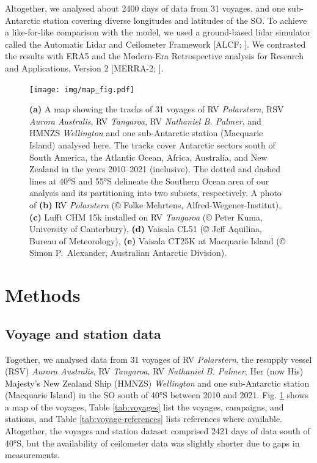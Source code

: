 \documentclass[12pt,a4paper]{article}
\begin{document}
Altogether, we analysed about 2400 days of data from 31 voyages, and one
sub-Antarctic station covering diverse longitudes and latitudes of the SO. To
achieve a like-for-like comparison with the model, we used a ground-based lidar
simulator called the Automatic Lidar and Ceilometer Framework [ALCF;
\cite{kuma2021}]. We contrasted the results with ERA5 \citep{era5} and the
Modern-Era Retrospective analysis for Research and Applications, Version 2
[MERRA-2; \cite{gelaro2017}].

\begin{figure}[b!]
\centering
\texttt{[image: img/map\_fig.pdf]}
\caption{
\textbf{(a)} A map showing the tracks of 31 voyages of RV \emph{Polarstern},
RSV \emph{Aurora Australis}, RV \emph{Tangaroa}, RV \emph{Nathaniel B. Palmer},
and HMNZS \emph{Wellington} and one sub-Antarctic station (Macquarie Island)
analysed here. The tracks cover Antarctic sectors south of South America, the
Atlantic Ocean, Africa, Australia, and New Zealand in the years 2010--2021
(inclusive).  The dotted and dashed lines at 40°S and 55°S delineate the
Southern Ocean area of our analysis and its partitioning into two subsets,
respectively.  A photo of \textbf{(b)} RV \emph{Polarstern} (© Folke Mehrtens,
Alfred-Wegener-Institut), \textbf{(c)} Lufft CHM 15k installed on RV
\emph{Tangaroa} (© Peter Kuma, University of Canterbury), \textbf{(d)} Vaisala
CL51 (© Jeff Aquilina, Bureau of Meteorology), \textbf{(e)} Vaisala CT25K at
Macquarie Island (© Simon P.\ Alexander, Australian Antarctic Division).
}
\label{fig:map}
\end{figure}

\section{Methods}
\label{sec:methods}

\subsection{Voyage and station data}

Together, we analysed data from 31 voyages of RV \emph{Polarstern}, the resupply
vessel (RSV) \emph{Aurora Australis}, RV \emph{Tangaroa}, RV \emph{Nathaniel B.
Palmer}, Her (now His) Majesty's New Zealand Ship (HMNZS) \emph{Wellington} and one
sub-Antarctic station (Macquarie Island) in the SO south of 40°S between 2010
and 2021. Fig. \ref{fig:map} shows a map of the voyages, Table
\ref{tab:voyages} list the voyages, campaigns, and stations, and Table
\ref{tab:voyage-references} lists references where available. Altogether, the
voyages and station dataset comprised 2421 days of data south of 40°S, but the
availability of ceilometer data was slightly shorter due to gaps in
measurements.
\end{document}
